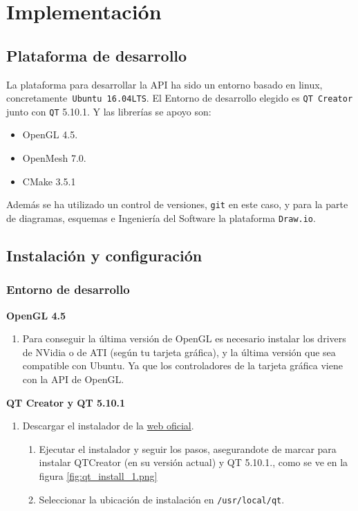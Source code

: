 \chapter{ Implementación}

\section{ Plataforma de desarrollo}
La plataforma para desarrollar la API ha sido un entorno basado en linux, concretamente\texttt{ Ubuntu 16.04LTS}. El Entorno de desarrollo elegido es \texttt{QT Creator} junto con \texttt{QT} 5.10.1. Y las librerías se apoyo son:
\begin{itemize}
	\item OpenGL 4.5.
	\item OpenMesh 7.0.
	\item CMake 3.5.1
\end{itemize} 

Además se ha utilizado un control de versiones, \texttt{git} en este caso, y para la parte de diagramas, esquemas e Ingeniería del Software la plataforma \texttt{Draw.io}. 
 
\section{ Instalación y configuración}

\subsection{ Entorno de desarrollo}
\textbf{OpenGL 4.5}
\begin{enumerate}
	\item Para conseguir la última versión de OpenGL es necesario instalar los drivers de NVidia o de ATI (según tu tarjeta gráfica), y la última versión que sea compatible con Ubuntu. Ya que los controladores de la tarjeta gráfica viene con la API de OpenGL.
\end{enumerate} 

\newpage
\textbf{QT Creator y QT 5.10.1}
\begin{enumerate}
	\item Descargar el instalador de la \href{https://www.qt.io/download}{web oficial}.
	\begin{enumerate}
		\item Ejecutar el instalador y seguir los pasos, asegurandote de marcar para instalar QTCreator (en su versión actual) y QT 5.10.1., como se ve en la figura \ref{fig:qt_install_1.png}
		\item Seleccionar la ubicación de instalación en \texttt{/usr/local/qt}.
	\end{enumerate}
\end{enumerate} 

